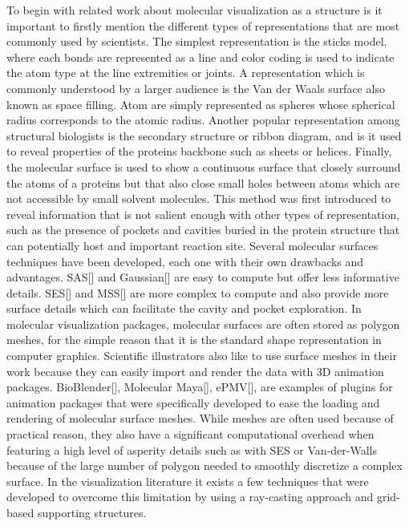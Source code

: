 To begin with related work about molecular visualization as a structure is it important to firstly mention the different types of representations that are most commonly used by scientists.
The simplest representation is the sticks model, where each bonds are represented as a line and color coding is used to indicate the atom type at the line extremities or joints.
A representation which is commonly understood by a larger audience is the Van der Waals surface also known as space filling. 
Atom are simply represented as spheres whose spherical radius corresponds to the atomic radius.
Another popular representation among structural biologists is the secondary structure or ribbon diagram, and is it used to reveal properties of the proteins backbone such as sheets or helices.
Finally, the molecular surface is used to show a continuous surface that closely surround the atoms of a proteins but that also close small holes between atoms which are not accessible by small solvent molecules.
This method was first introduced to reveal information that is not salient enough with other types of representation, such as the presence of pockets and cavities buried in the protein structure that can potentially host and important reaction site.
Several molecular surfaces techniques have been developed, each one with their own drawbacks and advantages.
SAS[] and Gaussian[] are easy to compute but offer less informative details.
SES[] and MSS[] are more complex to compute and also provide more surface details which can facilitate the cavity and pocket exploration.
In molecular visualization packages, molecular surfaces are often stored as polygon meshes, for the simple reason that it is the standard shape representation in computer graphics.
Scientific illustrators also like to use surface meshes in their work because they can easily import and render the data with 3D animation packages.
BioBlender[], Molecular Maya[], ePMV[], are examples of plugins for animation packages that were specifically developed to ease the loading and rendering of molecular surface meshes.
While meshes are often used because of practical reason, they also have a significant computational overhead when featuring a high level of asperity details such as with SES or Van-der-Walls because of the large number of polygon needed to smoothly discretize a complex surface.
In the visualization literature it exists a few techniques that were developed to overcome this limitation by using a ray-casting approach and grid-based supporting structures.
